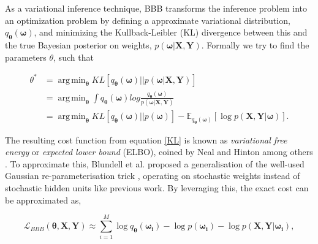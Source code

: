 \documentclass[a4paper,12pt]{report}
\DeclareMathOperator{\argmin}{arg\,min}
\newcommand{\Lagr}{\mathcal{L}}
\begin{document}
As a variational inference technique, BBB transforms the inference problem into an optimization problem by defining a approximate variational distribution, $q_{\bm{\theta}}(\bm{\omega})$, and minimizing the Kullback-Leibler (KL) \cite{kullback1951information}  divergence between this and the true Bayesian posterior on weights, $p(\bm{\omega}|\bm{X},\bm{Y})$. Formally we try to find the parameters $\theta$, such that

\begin{equation} \label{KL}
\begin{split}
\theta^* & = \argmin_{\bm{\theta}} KL[q_{\bm{\theta}}(\bm{\omega})||p(\bm{\omega}|\bm{X},\bm{Y})]
\\
 & = \argmin_{\bm{\theta}} \int q_{\bm{\theta}}(\bm{\omega}) log \frac{q_{\bm{\theta}}(\bm{\omega})}{p(\bm{\omega}|\bm{X},\bm{Y})} \\
 & = \argmin_{\bm{\theta}} KL[q_{\bm{\theta}}(\bm{\omega})||p(\bm{\omega})]- \mathbb{E}_{q_{\bm{\theta}}(\bm{\omega})}[\log p(\bm{X},\bm{Y}|\bm{\omega})].
\end{split}
\end{equation}

 The resulting cost function from equation \eqref{KL} is known as \textit{variational free energy} or \textit{expected lower bound} (ELBO),  coined by Neal and Hinton among others \cite{neal1998view, saul1996mean}. To approximate this, Blundell et al. \cite{blundell2015weight} proposed a generalisation of the well-used Gaussian re-parameterisation trick \cite{kingma2013auto, opper2009variational, rezende2014stochastic}, operating on stochastic weights instead of stochastic hidden units like previous work. By leveraging this, the exact cost can be approximated as, 
 
\begin{equation}
\label{loss_BBB}
\Lagr_{BBB}(\bm{\theta},\bm{X},\bm{Y}) \approx \sum_{i = 1}^{M} 
\log q_{\bm{\theta}}(\bm{\omega_i}) - \log p(\bm{\omega_i}) - \log p(\bm{X},\bm{Y}|\bm{\omega_i}),
\end{equation}
\end{document}
